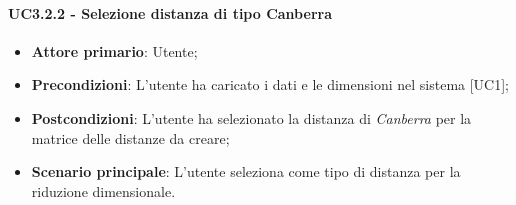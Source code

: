 \paragraph{UC3.2.2 - Selezione distanza di tipo Canberra}
\begin{itemize}
	\item \textbf{Attore primario}: Utente;
	\item \textbf{Precondizioni}: L'utente ha caricato i dati e le dimensioni nel sistema [UC1];
	\item \textbf{Postcondizioni}: L'utente ha selezionato la distanza di \textit{Canberra} per la matrice delle distanze da creare;
	\item \textbf{Scenario principale}: L'utente seleziona  come tipo di distanza per la riduzione dimensionale.

\end{itemize}
